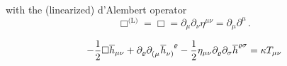 with the (linearized) d'Alembert operator
\begin{equation}
    \Box^{\text{(L)}} = \Box = \partial_\mu\partial_\nu
    \eta^{\mu\nu}=\partial_\mu\partial^\mu\,.
\end{equation}
\begin{definition}
    \begin{equation}
        \label{eq:lineinsteineqs}
        -\frac{1}{2} \Box \overline{h}_{\mu\nu} + \partial_\varrho \tensor{\partial}{_(_\mu}\tensor{\overline{h}}{_\nu_)^\varrho}
        - \frac{1}{2} \eta_{\mu\nu}\partial_\varrho\partial_\sigma \overline{h}^{\varrho\sigma} = \kappa T_{\mu\nu}
    \end{equation}
\end{definition}

